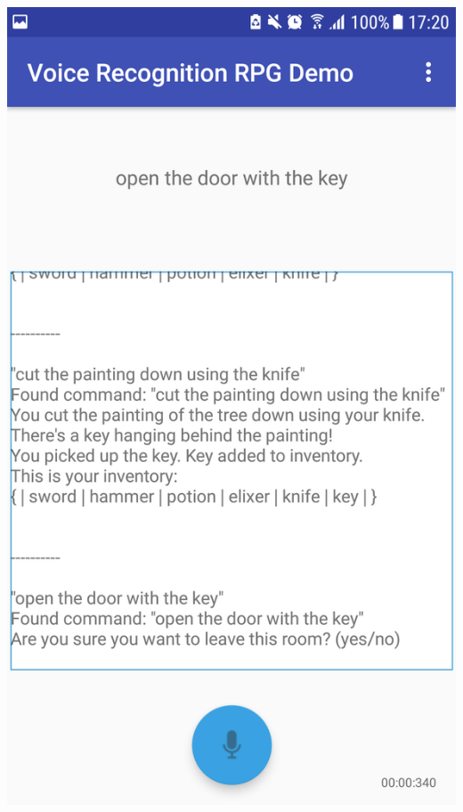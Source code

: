 \documentclass[11pt]{article}
\begin{document}
\begin{center}
\includegraphics[scale=0.18]{overworld-3.png}

\end{center}
\end{document}

